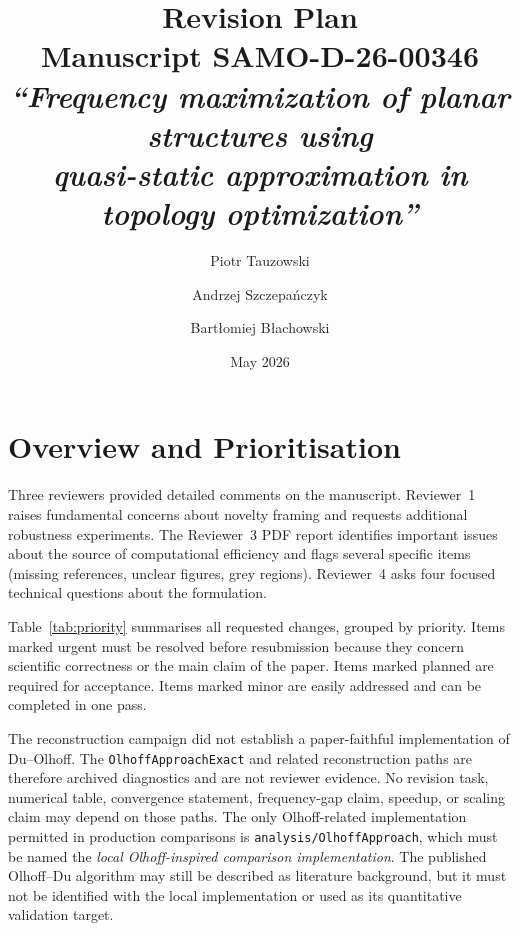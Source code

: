 \documentclass[12pt,a4paper]{article}
\title{\textbf{Revision Plan}\\[4pt]
\large Manuscript SAMO-D-26-00346\\
\textit{``Frequency maximization of planar structures using\\quasi-static approximation in topology optimization''}}
\author{Piotr Tauzowski \and Andrzej Szczepańczyk \and Bartłomiej Błachowski}
\date{May 2026}
\newcommand{\planned}[1]{{\color{mplanned}#1}}
\newcommand{\urgent}[1]{{\color{murgent}#1}}
\newcommand{\minor}[1]{{\color{mminor}#1}}
\begin{document}
\maketitle
\tableofcontents
\newpage

\section{Overview and Prioritisation}

Three reviewers provided detailed comments on the manuscript.
Reviewer~1 raises fundamental concerns about novelty framing and requests
additional robustness experiments. The Reviewer~3 PDF report identifies
important issues about the source of computational efficiency and flags
several specific items (missing references, unclear figures, grey regions).
Reviewer~4 asks four focused technical questions about the formulation.

Table~\ref{tab:priority} summarises all requested changes, grouped by
priority.  Items marked \urgent{urgent} must be resolved before resubmission
because they concern scientific correctness or the main claim of the paper.
Items marked \planned{planned} are required for acceptance. Items marked
\minor{minor} are easily addressed and can be completed in one pass.

\begin{tcolorbox}[colback=yellow!8,colframe=black,title={Comparator-evidence policy (July 2026)}]
The reconstruction campaign did not establish a paper-faithful implementation
of Du--Olhoff.  The \texttt{OlhoffApproachExact} and related reconstruction
paths are therefore archived diagnostics and are not reviewer evidence.  No
revision task, numerical table, convergence statement, frequency-gap claim,
speedup, or scaling claim may depend on those paths.  The only Olhoff-related
implementation permitted in production comparisons is
\texttt{analysis/OlhoffApproach}, which must be named the
\emph{local Olhoff-inspired comparison implementation}.  The published
Olhoff--Du algorithm may still be described as literature background, but it
must not be identified with the local implementation or used as its
quantitative validation target.
\end{tcolorbox}
\end{document}
